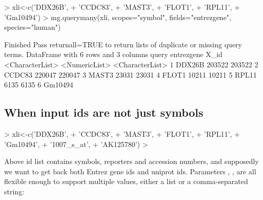 \documentclass[12pt]{article}
\begin{document}
\begin{Schunk}
\begin{Sinput}
> xli<-c('DDX26B',
+  'CCDC83',
+  'MAST3',
+  'FLOT1',
+  'RPL11',
+  'Gm10494')
> mg.querymany(xli, scopes="symbol", fields="entrezgene", species="human")
\end{Sinput}
\begin{Soutput}
Finished
Pass returnall=TRUE to return lists of duplicate or missing query terms.
DataFrame with 6 rows and 3 columns
            query    entrezgene            X_id
  <CharacterList> <NumericList> <CharacterList>
1          DDX26B        203522          203522
2          CCDC83        220047          220047
3           MAST3         23031           23031
4           FLOT1         10211           10211
5           RPL11          6135            6135
6         Gm10494                              
\end{Soutput}
\end{Schunk}

\subsection{When input ids are not just symbols}

\begin{Schunk}
\begin{Sinput}
> xli<-c('DDX26B',
+  'CCDC83',
+  'MAST3',
+  'FLOT1',
+  'RPL11',
+  'Gm10494',
+  '1007_s_at',
+  'AK125780')
> 
\end{Sinput}
\end{Schunk}

Above id list contains symbols, reporters and accession numbers, and supposedly we want to get back both Entrez gene ids and uniprot ids. Parameters , ,  are all flexible enough to support multiple values, either a list or a comma-separated string:
\end{document}
